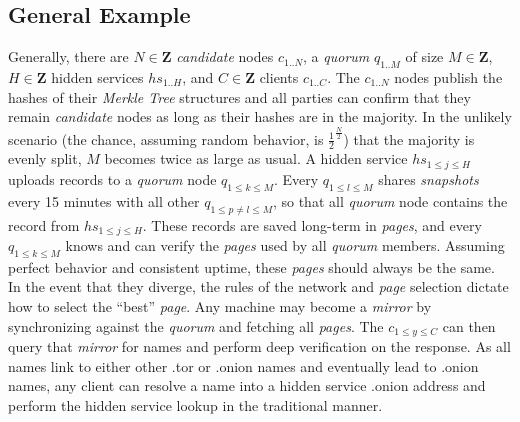 \subsection{General Example}

Generally, there are $ N \in \textbf{Z} $ \emph{candidate} nodes $ c_{1..N} $, a \emph{quorum} $ q_{1..M} $ of size $ M \in \textbf{Z} $, $ H \in \textbf{Z} $ hidden services $ hs_{1..H} $, and $ C \in \textbf{Z} $ clients $ c_{1..C} $. The $ c_{1..N} $ nodes publish the hashes of their \emph{Merkle Tree} structures and all parties can confirm that they remain \emph{candidate} nodes as long as their hashes are in the majority. In the unlikely scenario (the chance, assuming random behavior, is $ \frac{1}{2} ^ {\frac{N}{2}} $) that the majority is evenly split, $ M $ becomes twice as large as usual. A hidden service $ hs_{1 \le j \le H} $ uploads records to a \emph{quorum} node $ q_{1 \le k \le M} $. Every $ q_{1 \le l \le M} $ shares \emph{snapshots} every 15 minutes with all other $ q_{1 \le p \neq l \le M} $, so that all \emph{quorum} node contains the record from $ hs_{1 \le j \le H} $. These records are saved long-term in \emph{pages}, and every $ q_{1 \le k \le M} $ knows and can verify the \emph{pages} used by all \emph{quorum} members. Assuming perfect behavior and consistent uptime, these \emph{pages} should always be the same. In the event that they diverge, the rules of the network and \emph{page} selection dictate how to select the ``best'' \emph{page}. Any machine may become a \emph{mirror} by synchronizing against the \emph{quorum} and fetching all \emph{pages}. The $ c_{1 \le y \le C} $ can then query that \emph{mirror} for names and perform deep verification on the response. As all names link to either other .tor or .onion names and eventually lead to .onion names, any client can resolve a name into a hidden service .onion address and perform the hidden service lookup in the traditional manner.



